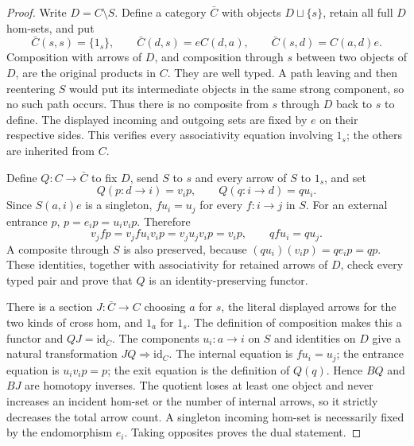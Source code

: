 \begin{proof}
Write $D=C\setminus S$. Define a category $\bar C$ with
objects $D\sqcup\{s\}$, retain all full $D$ hom-sets,
and put
\[
 \bar C(s,s)=\{1_s\},\qquad
 \bar C(d,s)=eC(d,a),\qquad
 \bar C(s,d)=C(a,d)e.
\]
Composition with arrows of $D$, and composition through
$s$ between two objects of $D$, are the original products
in $C$. They are well typed. A path leaving and then
reentering $S$ would put its intermediate objects in the
same strong component, so no such path occurs. Thus there
is no composite from $s$ through $D$ back to $s$ to define.
The displayed incoming and outgoing sets are fixed by $e$
on their respective sides. This verifies every associativity
equation involving $1_s$; the others are inherited from $C$.

Define $Q:C\to\bar C$ to fix $D$, send $S$ to $s$ and
every arrow of $S$ to $1_s$, and set
\[
 Q(p:d\to i)=v_i p,\qquad
 Q(q:i\to d)=q u_i.
\]
Since $S(a,i)e$ is a singleton, $f u_i=u_j$ for every
$f:i\to j$ in $S$. For an external entrance $p$,
$p=e_i p=u_i v_i p$. Therefore
\[
 v_j f p=v_j f u_i v_i p=v_j u_j v_i p=v_i p,
 \qquad q f u_i=q u_j.
\]
A composite through $S$ is also preserved, because
$(q u_i)(v_i p)=q e_i p=qp$.
These identities, together with associativity for retained
arrows of $D$, check every typed pair and prove that $Q$
is an identity-preserving functor.

There is a section $J:\bar C\to C$ choosing $a$ for $s$,
the literal displayed arrows for the two kinds of cross hom,
and $1_a$ for $1_s$. The definition of composition makes
this a functor and $QJ=\mathrm{id}_{\bar C}$.
The components $u_i:a\to i$ on $S$ and identities on $D$
give a natural transformation $JQ\Rightarrow\mathrm{id}_C$.
The internal equation is $f u_i=u_j$; the entrance equation
is $u_iv_ip=p$; the exit equation is the definition of $Q(q)$.
Hence $BQ$ and $BJ$ are homotopy inverses.
The quotient loses at least one object and never increases
an incident hom-set or the number of internal arrows, so it
strictly decreases the total arrow count. A singleton incoming
hom-set is necessarily fixed by the endomorphism $e_i$.
Taking opposites proves the dual statement.
\end{proof}

